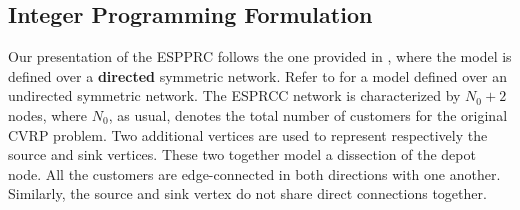 \begin{comment}

[MY OWN STUFF, kept for reference purpose. TODO: Merge or delete later]
\subsection{Shortest Path Problem with Resource Constraints}
If there are no negative cost cyles, e.g. when the reduced cost variables are positive $\bar{c}_{ij} \ge 0$,
the ESPPRC problem is solvable in polynomial time, since the elementarity conditions are guaranteed
to be satisfied in this case.
In this particular case, some authors have proposed efficient methods to tackle this case:
\cite{beasley1989,carlyle2008,dumitrescu2003improved,muhandiramge2009}.
These proposed approaches work under the assumption that no negative cost cycle is present,
and use lagrangian relaxation to relax the capacity constraints.

\subsection{Elementary Shortest Path Problem with Resource Constraints}
In the case where the network may be contain negative cost cycles, the
elementarity condition must be explicitly modeled, or relaxed, in order
to obtain reasonable dual bound solutions for the CVRP.
\textcite{feillet2004} proposes a dynamic programming algorithm where
the elementary property is handled through the usage of an additional resource
bound to each node.
\textcite{righini2006} proposes a bi-directional dynamic programming algorithm to solve the ESPPRC.
\end{comment}

\subsection{Integer Programming Formulation}
\label{sec:espprc-integer-programming-formulation}

Our presentation of the ESPPRC follows the one provided in \textcite{beasley1989, toth2002, toth2014},
where the model is defined over  a \textbf{directed} symmetric network.
Refer to \textcite{jepsen2008} for a model defined over an undirected symmetric network.
The ESPRCC network is characterized by $N_0 + 2$ nodes,
where $N_0$, as usual, denotes the total number of customers for the original CVRP problem.
Two additional vertices are used to represent respectively the source and sink vertices.
These two together model a dissection of the depot node.
All the customers are edge-connected in both directions with one another.
Similarly, the source and sink vertex do not share direct connections together.

